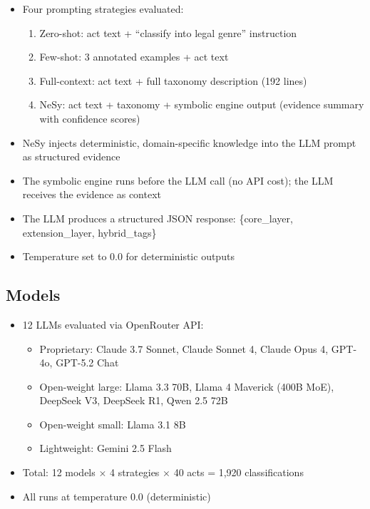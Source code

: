 \documentclass[10pt, a4paper]{article}
\begin{document}
\begin{itemize}
\item Four prompting strategies evaluated:
  \begin{enumerate}
  \item Zero-shot: act text + ``classify into legal genre'' instruction
  \item Few-shot: 3 annotated examples + act text
  \item Full-context: act text + full taxonomy description (192 lines)
  \item NeSy: act text + taxonomy + symbolic engine output (evidence summary with confidence scores)
  \end{enumerate}
\item NeSy injects deterministic, domain-specific knowledge into the LLM prompt as structured evidence
\item The symbolic engine runs before the LLM call (no API cost); the LLM receives the evidence as context
\item The LLM produces a structured JSON response: \{core\_layer, extension\_layer, hybrid\_tags\}
\item Temperature set to 0.0 for deterministic outputs
\end{itemize}

\subsection{Models}

\begin{itemize}
\item 12 LLMs evaluated via OpenRouter API:
  \begin{itemize}
  \item Proprietary: Claude 3.7 Sonnet, Claude Sonnet 4, Claude Opus 4, GPT-4o, GPT-5.2 Chat
  \item Open-weight large: Llama 3.3 70B, Llama 4 Maverick (400B MoE), DeepSeek V3, DeepSeek R1, Qwen 2.5 72B
  \item Open-weight small: Llama 3.1 8B
  \item Lightweight: Gemini 2.5 Flash
  \end{itemize}
\item Total: 12 models $\times$ 4 strategies $\times$ 40 acts = 1,920 classifications
\item All runs at temperature 0.0 (deterministic)
\end{itemize}
\end{document}
